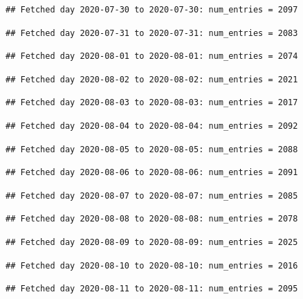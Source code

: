 \documentclass[]{article}
\begin{document}
\begin{verbatim}
## Fetched day 2020-07-30 to 2020-07-30: num_entries = 2097
\end{verbatim}

\begin{verbatim}
## Fetched day 2020-07-31 to 2020-07-31: num_entries = 2083
\end{verbatim}

\begin{verbatim}
## Fetched day 2020-08-01 to 2020-08-01: num_entries = 2074
\end{verbatim}

\begin{verbatim}
## Fetched day 2020-08-02 to 2020-08-02: num_entries = 2021
\end{verbatim}

\begin{verbatim}
## Fetched day 2020-08-03 to 2020-08-03: num_entries = 2017
\end{verbatim}

\begin{verbatim}
## Fetched day 2020-08-04 to 2020-08-04: num_entries = 2092
\end{verbatim}

\begin{verbatim}
## Fetched day 2020-08-05 to 2020-08-05: num_entries = 2088
\end{verbatim}

\begin{verbatim}
## Fetched day 2020-08-06 to 2020-08-06: num_entries = 2091
\end{verbatim}

\begin{verbatim}
## Fetched day 2020-08-07 to 2020-08-07: num_entries = 2085
\end{verbatim}

\begin{verbatim}
## Fetched day 2020-08-08 to 2020-08-08: num_entries = 2078
\end{verbatim}

\begin{verbatim}
## Fetched day 2020-08-09 to 2020-08-09: num_entries = 2025
\end{verbatim}

\begin{verbatim}
## Fetched day 2020-08-10 to 2020-08-10: num_entries = 2016
\end{verbatim}

\begin{verbatim}
## Fetched day 2020-08-11 to 2020-08-11: num_entries = 2095
\end{verbatim}
\end{document}
